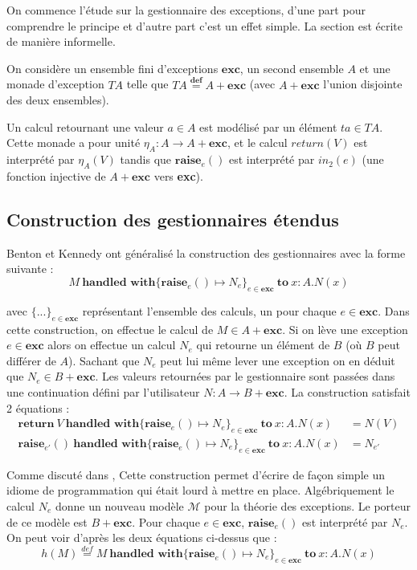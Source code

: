 On commence l'étude sur la gestionnaire des exceptions, d'une part pour comprendre le principe et d'autre part c'est un effet simple. La section est écrite de manière informelle.
\medbreak

On considère un ensemble fini d'exceptions $\textbf{exc}$, un second ensemble $A$ et 
une monade d'exception $TA$ telle que $TA \overset{\textbf{def}}{=} A + \textbf{exc}$ 
(avec $A + \textbf{exc}$ l'union disjointe des deux ensembles). 

Un calcul retournant une valeur $a \in A$ est modélisé par un élément $ta \in TA$. 
Cette monade a pour unité $\eta_A : A \rightarrow A + \textbf{exc}$, et le calcul 
$return(V)$ est interprété par $\eta_A(V)$ tandis que $\textbf{raise}_e()$ est 
interprété par $in_2(e)$ (une fonction injective de $A + \textbf{exc}$ vers \textbf{exc}).

\subsection{Construction des gestionnaires étendus}

	Benton et Kennedy ont généralisé la construction des gestionnaires avec la forme suivante :
	\[M~\textbf{handled~with} \{\textbf{raise}_e() \mapsto N_e\}_{e \in \textbf{exc}}~\textbf{to}~ x:A.N(x)\]
	
	avec $\{...\}_{e \in \textbf{exc}}$ représentant l'ensemble des calculs, un pour chaque $e \in \textbf{exc}$. Dans cette construction, 
	on effectue le calcul de $M \in A + \textbf{exc}$. Si on lève une exception 
	$e \in \textbf{exc}$ alors on effectue un calcul $N_e$ qui retourne un élément de $B$
	(où $B$ peut différer de $A$). Sachant que $N_e$ peut lui même lever une exception 
	on en déduit que $N_e \in B + \textbf{exc}$. Les valeurs retournées par le gestionnaire sont passées dans une continuation défini par l'utilisateur $N : A \rightarrow B + \textbf{exc}$. La construction satisfait 2 équations :
	\begin{align*}
		\textbf{return} ~V~\textbf{handled~with} \{\textbf{raise}_e() \mapsto N_e\}_{e \in \textbf{exc}}~\textbf{to}~ x:A.N(x) &= N(V)\\
		\textbf{raise}_{e'}()~\textbf{handled~with} \{\textbf{raise}_e() \mapsto N_e\}_{e \in \textbf{exc}}~\textbf{to}~ x:A.N(x) &= N_{e'}
	\end{align*}
	
	Comme discuté dans \cite{DBLP:journals/jfp/BentonK01}, Cette construction permet d'écrire de façon simple un idiome de programmation qui était lourd à mettre en place. 
	\smallbreak
	Algébriquement le calcul $N_e$ donne un nouveau modèle $\mathcal{M}$ pour la théorie des exceptions. Le porteur de ce modèle est $B + \textbf{exc}$. Pour chaque $e \in \textbf{exc}$, $\textbf{raise}_e()$ est interprété par $N_e$. On peut voir d'après les deux équations ci-dessus que :
	\[h(M) \overset{def}{=} M~\textbf{handled~with} \{\textbf{raise}_e() \mapsto N_e\}_{e \in \textbf{exc}}~\textbf{to}~ x:A.N(x)\]
	
